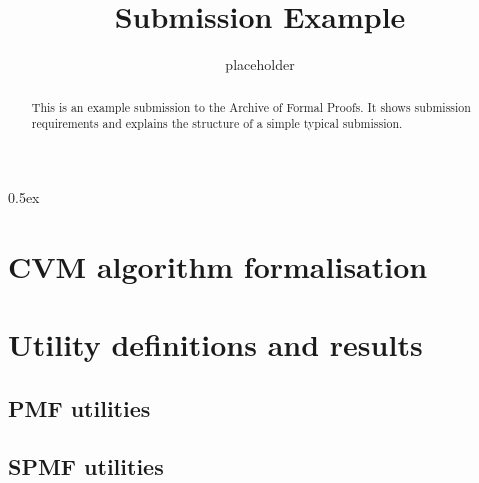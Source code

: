 \documentclass[11pt, a4paper]{report}
\begin{document}
\title{Submission Example}

\author{placeholder}

\maketitle

\begin{abstract}
  This is an example submission to the Archive of Formal Proofs. It
  shows submission requirements and explains the structure of a simple
  typical submission.
\end{abstract}

\tableofcontents

\parindent 0pt
\parskip 0.5ex

\chapter{CVM algorithm formalisation}










\chapter{Utility definitions and results}






\section{PMF utilities}






\section{SPMF utilities}





% 
% 
\end{document}

